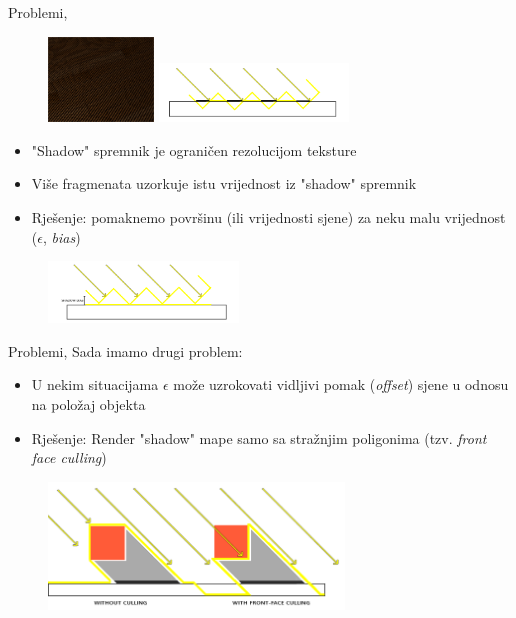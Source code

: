 \documentclass[9pt]{beamer}
\begin{document}
\begin{frame}{Problemi, }
	\begin{figure}
		\centering
		\includegraphics[width=0.25\textwidth]{slike/shadow_mapping_acne.png}
		\includegraphics[width=0.45\textwidth]{slike/shadow_mapping_acne_diagram.png}
	\end{figure}
	\begin{itemize}
		\item "Shadow" spremnik je ograničen rezolucijom teksture
		\item Više fragmenata uzorkuje istu vrijednost iz  "shadow" spremnik
		\item Rješenje: pomaknemo površinu (ili vrijednosti sjene) za neku malu vrijednost ($\epsilon$, \textit{bias})
	\end{itemize}
\begin{figure}
	\centering
	\includegraphics[width=0.45\textwidth]{slike/shadow_mapping_acne_bias.png}
\end{figure}
\end{frame}

\begin{frame}{Problemi, }
	Sada imamo drugi problem:
	\begin{itemize}
		\item U nekim situacijama $\epsilon$ može uzrokovati vidljivi pomak (\textit{offset}) sjene u odnosu na položaj objekta
		\item Rješenje: Render "shadow" mape samo sa stražnjim poligonima (tzv. \textit{front face culling})
	\end{itemize}
	\begin{figure}
		\centering
		\includegraphics[width=0.7\textwidth]{slike/shadow_mapping_culling.png}
	\end{figure}
\end{frame}
\end{document}
